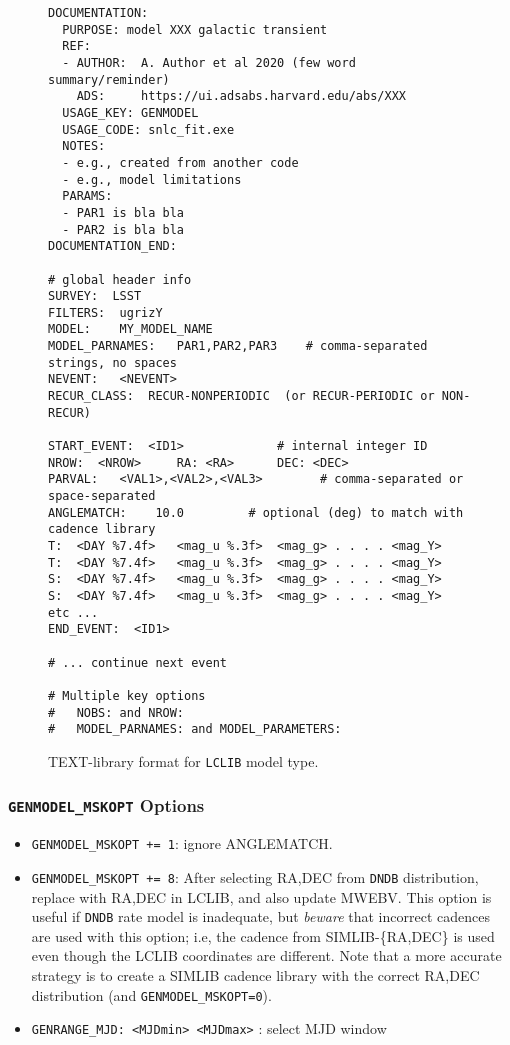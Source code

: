 \documentclass[12pt]{article}
\begin{document}
\begin{figure}    
\begin{center}
\begin{verbatim}
DOCUMENTATION:
  PURPOSE: model XXX galactic transient
  REF: 
  - AUTHOR:  A. Author et al 2020 (few word summary/reminder) 
    ADS:     https://ui.adsabs.harvard.edu/abs/XXX
  USAGE_KEY: GENMODEL 
  USAGE_CODE: snlc_fit.exe  
  NOTES:
  - e.g., created from another code
  - e.g., model limitations
  PARAMS:
  - PAR1 is bla bla
  - PAR2 is bla bla
DOCUMENTATION_END:

# global header info
SURVEY:  LSST
FILTERS:  ugrizY
MODEL:    MY_MODEL_NAME
MODEL_PARNAMES:   PAR1,PAR2,PAR3    # comma-separated strings, no spaces
NEVENT:   <NEVENT>
RECUR_CLASS:  RECUR-NONPERIODIC  (or RECUR-PERIODIC or NON-RECUR)

START_EVENT:  <ID1>             # internal integer ID
NROW:  <NROW>     RA: <RA>      DEC: <DEC>
PARVAL:   <VAL1>,<VAL2>,<VAL3>        # comma-separated or space-separated 
ANGLEMATCH:    10.0         # optional (deg) to match with cadence library
T:  <DAY %7.4f>   <mag_u %.3f>  <mag_g> . . . . <mag_Y>
T:  <DAY %7.4f>   <mag_u %.3f>  <mag_g> . . . . <mag_Y>
S:  <DAY %7.4f>   <mag_u %.3f>  <mag_g> . . . . <mag_Y>
S:  <DAY %7.4f>   <mag_u %.3f>  <mag_g> . . . . <mag_Y>
etc ...
END_EVENT:  <ID1>

# ... continue next event

# Multiple key options
#   NOBS: and NROW: 
#   MODEL_PARNAMES: and MODEL_PARAMETERS:
\end{verbatim}
\end{center}
\caption{ TEXT-library format for {\tt LCLIB} model type. }
\label{fig:LCLIB_format}
\end{figure}

\subsubsection{{\tt GENMODEL\_MSKOPT} Options}
\label{sss:LCLIB_options}

\begin{itemize}
  \item {\tt GENMODEL\_MSKOPT += 1}: ignore ANGLEMATCH.   
  \item {\tt GENMODEL\_MSKOPT += 8}: 
     After selecting RA,DEC from {\tt DNDB} distribution, replace 
     with RA,DEC in LCLIB, and also update MWEBV. This option is
     useful if {\tt DNDB} rate model is inadequate,
     but {\it beware} that incorrect cadences are used with this option;
     i.e, the cadence from SIMLIB-\{RA,DEC\} is used even
     though the LCLIB coordinates are different.
     Note that a more accurate strategy is to create a 
     SIMLIB cadence library with the correct RA,DEC distribution
     (and {\tt GENMODEL\_MSKOPT=0}).
  \item {\tt GENRANGE\_MJD: <MJDmin> <MJDmax>} : select MJD window
\end{itemize}
\end{document}
